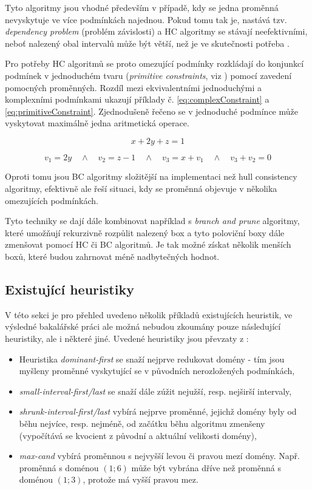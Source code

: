 Tyto algoritmy jsou vhodné především v případě, kdy se jedna proměnná nevyskytuje ve více podmínkách najednou. Pokud tomu tak je, nastává tzv. \emph{dependency problem} (problém závislosti) a HC algoritmy se stávají neefektivními, neboť nalezený obal intervalů může být větší, než je ve skutečnosti potřeba \cite{BenhamouCLPIntervals}.

Pro potřeby HC algoritmů se proto omezující podmínky rozkládají do konjunkcí podmínek v jednoduchém tvaru (\emph{primitive constraints}, viz \cite{kue12}) pomocí zavedení pomocných proměnných. Rozdíl mezi ekvivalentními jednoduchými a komplexními podmínkami ukazují příklady č. \ref{eq:complexConstraint} a \ref{eq:primitiveConstraint}. Zjednodušeně řečeno se v jednoduché podmínce může vyskytovat maximálně jedna aritmetická operace.

\begin{equation} \label{eq:complexConstraint}
x + 2y + z = 1
\end{equation}

\begin{equation} \label{eq:primitiveConstraint}
v_1 = 2y \quad \wedge \quad v_2 = z - 1 \quad \wedge \quad v_3 = x + v_1 \quad \wedge \quad v_3 + v_2 = 0
\end{equation}

Oproti tomu jsou BC algoritmy složitější na implementaci než hull consistency algoritmy, efektivně ale řeší situaci, kdy se proměnná objevuje v několika omezujících podmínkách.

Tyto techniky se dají dále kombinovat například s \emph{branch and prune} algoritmy, které umožňují rekurzivně rozpůlit nalezený box a tyto poloviční boxy dále zmenšovat pomocí HC či BC algoritmů. Je tak možné získat několik menších boxů, které budou zahrnovat méně nadbytečných hodnot.

\subsection{Existující heuristiky}
V této sekci je pro přehled uvedeno několik příkladů existujících heuristik, ve výsledné bakalářské práci ale možná nebudou zkoumány pouze následující heuristiky, ale i některé jiné. Uvedené heuristiky jsou převzaty z \cite{feiten10}:

\begin{itemize}
  \item Heuristika \emph{dominant-first} se snaží nejprve redukovat domény  - tím jsou myšleny proměnné vyskytující se v původních nerozložených podmínkách,
  \item \emph{small-interval-first/last} se snaží dále zúžit nejužší, resp. nejširší intervaly,
  \item \emph{shrunk-interval-first/last} vybírá nejprve proměnné, jejichž domény byly od běhu nejvíce, resp. nejméně, od začátku běhu algoritmu zmenšeny (vypočítává se kvocient z původní a aktuální velikosti domény),
  \item \emph{max-cand} vybírá proměnnou s nejvyšší levou či pravou mezí domény. Např. proměnná s doménou $(1;6)$ může být vybrána dříve než proměnná s doménou $(1;3)$, protože má vyšší pravou mez.
\end{itemize}


